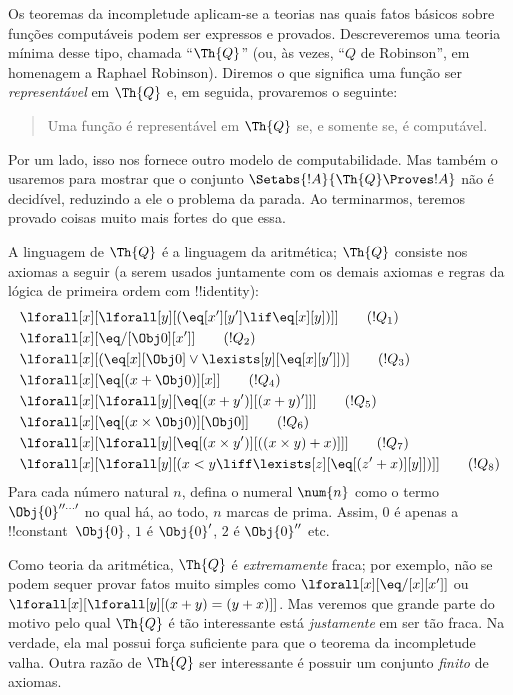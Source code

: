 \documentclass[../../../include/open-logic-section]{subfiles}
\begin{document}

Os teoremas da incompletude aplicam-se a teorias nas quais fatos
básicos sobre funções computáveis podem ser expressos e provados.
Descreveremos uma teoria mínima desse tipo, chamada ``$\Th{Q}$'' (ou,
às vezes, ``$Q$ de Robinson'', em homenagem a Raphael Robinson).
Diremos o que significa uma função ser \emph{representável} em
$\Th{Q}$ e, em seguida, provaremos o seguinte:
\begin{quote}
  Uma função é representável em $\Th{Q}$ se, e somente se, é computável.
\end{quote}
Por um lado, isso nos fornece outro modelo de computabilidade. Mas
também o usaremos para mostrar que o conjunto
$\Setabs{!A}{\Th{Q} \Proves !A}$ não é decidível, reduzindo a ele o
problema da parada. Ao terminarmos, teremos provado coisas muito mais
fortes do que essa.

A linguagem de $\Th{Q}$ é a linguagem da aritmética; $\Th{Q}$ consiste
nos axiomas a seguir (a serem usados juntamente com os demais axiomas e
regras da lógica de primeira ordem com !!{identity}):
\begin{align*}
& \lforall[x][\lforall[y][(\eq[x'][y'] \lif \eq[x][y])]] \tag{$!Q_1$}\\
& \lforall[x][\eq/[\Obj 0][x']] \tag{$!Q_2$}\\
& \lforall[x][(\eq[x][\Obj 0] \lor \lexists[y][\eq[x][y']])] \tag{$!Q_3$}\\
& \lforall[x][\eq[(x + \Obj 0)][x]] \tag{$!Q_4$}\\
& \lforall[x][\lforall[y][\eq[(x + y')][(x + y)']]] \tag{$!Q_5$}\\
& \lforall[x][\eq[(x \times \Obj 0)][\Obj 0]] \tag{$!Q_6$}\\
& \lforall[x][\lforall[y][\eq[(x \times y')][((x \times y) + x)]]] \tag{$!Q_7$}\\
& \lforall[x][\lforall[y][(x < y \liff \lexists[z][\eq[(z' + x)][y]])]] \tag{$!Q_8$}
\end{align*}
Para cada número natural $n$, defina o numeral $\num{n}$ como o termo
$\Obj{0}^{\prime\prime\ldots\prime}$ no qual há, ao todo, $n$ marcas
de prima. Assim, $\num{0}$ é apenas a !!{constant}~$\Obj{0}$,
$\num{1}$ é $\Obj{0}'$, $\num{2}$ é $\Obj{0}''$ etc.

Como teoria da aritmética, $\Th{Q}$ é \emph{extremamente} fraca; por
exemplo, não se podem sequer provar fatos muito simples como
$\lforall[x][\eq/[x][x']]$ ou $\lforall[x][\lforall[y][(x + y) = (y +
    x)]]$. Mas veremos que grande parte do motivo pelo qual $\Th{Q}$ é
tão interessante está \emph{justamente} em ser tão fraca. Na verdade,
ela mal possui força suficiente para que o teorema da incompletude
valha. Outra razão de $\Th{Q}$ ser interessante é possuir um conjunto
\emph{finito} de axiomas.
\end{document}
